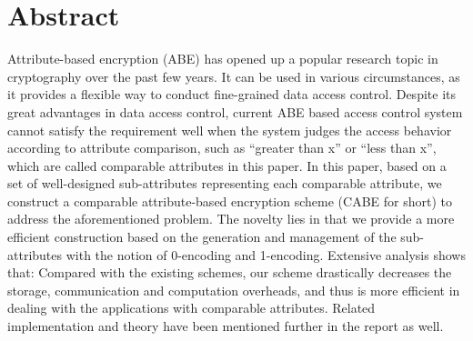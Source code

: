 \chapter*{Abstract}
\hspace{10mm}Attribute-based encryption (ABE) has opened up a popular research topic in cryptography over the past few years. It can be
used in various circumstances, as it provides a flexible way to conduct fine-grained data access control. Despite its great advantages in
data access control, current ABE based access control system cannot satisfy the requirement well when the system judges the access
behavior according to attribute comparison, such as “greater than x” or “less than x”, which are called comparable attributes in this
paper. In this paper, based on a set of well-designed sub-attributes representing each comparable attribute, we construct a comparable
attribute-based encryption scheme (CABE for short) to address the aforementioned problem. The novelty lies in that we provide a more
efficient construction based on the generation and management of the sub-attributes with the notion of 0-encoding and 1-encoding.
Extensive analysis shows that: Compared with the existing schemes, our scheme drastically decreases the storage, communication
and computation overheads, and thus is more efficient in dealing with the applications with comparable attributes. Related implementation and theory have been mentioned further in the report as well.
